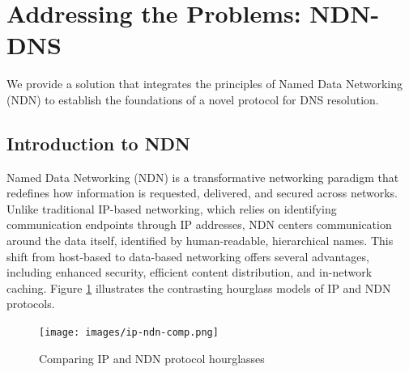 \documentclass[conference]{IEEEtran}
\begin{document}
\section{Addressing the Problems: NDN-DNS}
We provide a solution that integrates the principles of Named Data Networking (NDN) to establish the foundations of a novel protocol for DNS resolution.

\subsection{Introduction to NDN}
Named Data Networking (NDN) is a transformative networking paradigm that redefines how information is requested, delivered, and secured across networks. Unlike traditional IP-based networking, which relies on identifying communication endpoints through IP addresses, NDN centers communication around the data itself, identified by human-readable, hierarchical names. This shift from host-based to data-based networking offers several advantages, including enhanced security, efficient content distribution, and in-network caching. Figure \ref{fig:ip-ndn-comp} illustrates the contrasting hourglass models of IP and NDN protocols.

\begin{figure}[htbp]
    \centering
    \texttt{[image: images/ip-ndn-comp.png]}
    \caption{Comparing IP and NDN protocol hourglasses \cite{ndn}}
    \label{fig:ip-ndn-comp}
\end{figure}
\end{document}
